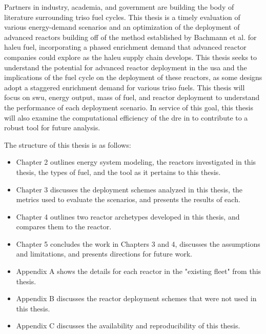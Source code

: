 Partners in industry, academia, and government are building the body of
literature surrounding \gls{triso} fuel cycles. This thesis is a timely
evaluation of various energy-demand scenarios and an optimization of the
deployment of advanced reactors building off of the method established by
Bachmann et al. \cite{bachmann_enrichment_2021} for \gls{haleu} fuel,
incorporating a phased enrichment demand that advanced reactor companies could
explore as the \gls{haleu} supply chain develops. This thesis seeks to
understand the potential for advanced reactor deployment in the \gls{usa} and
the implications of the fuel cycle on the deployment of these reactors, as some
designs adopt a staggered enrichment demand for various \gls{triso} fuels. This thesis will focus on \gls{swu}, energy output, mass of fuel, and reactor deployment to understand the performance of each deployment scenario. In service of this goal, this thesis will also examine the computational efficiency of the \gls{dre} in \cyclus to contribute to a robust tool for future analysis.


The structure of this thesis is as follows:

\begin{itemize}
    \item Chapter 2 outlines energy system modeling, the reactors investigated in this thesis, the types of fuel, and the \cyclus tool as it pertains to this thesis.
    \item Chapter 3 discusses the deployment schemes analyzed in this thesis, the metrics used to evaluate the scenarios, and presents the results of each.
    \item Chapter 4 outlines two reactor archetypes developed in this thesis, and compares them to the \cycamore reactor.
    \item Chapter 5 concludes the work in Chapters 3 and 4, discusses the assumptions and limitations, and presents directions for future work.
    \item Appendix A shows the details for each reactor in the "existing fleet" from this thesis.
    \item Appendix B discusses the reactor deployment schemes that were not used in this thesis.
    \item Appendix C discusses the availability and reproducibility of this thesis.
\end{itemize}